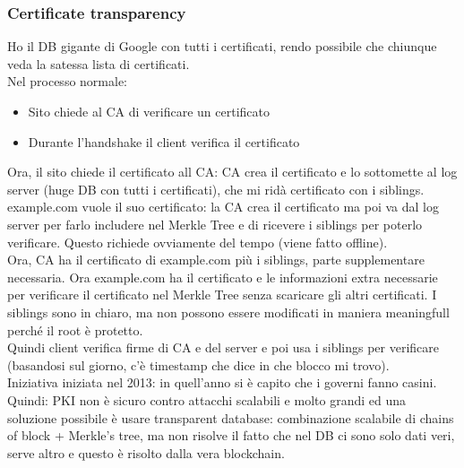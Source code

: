 \documentclass[16px]{article}
\begin{document}
\subsubsection{Certificate transparency}
Ho il DB gigante di Google con tutti i certificati, rendo possibile che chiunque veda la satessa lista di certificati.\\ Nel processo normale:
\begin{itemize}
\item Sito chiede al CA di verificare un certificato
\item Durante l'handshake il client verifica il certificato
\end{itemize}
Ora, il sito chiede il certificato all CA: CA crea il certificato e lo sottomette al log server (huge DB con tutti i certificati), che mi ridà certificato con i siblings.\\ example.com vuole il suo certificato: la CA crea il certificato ma poi va dal log server per farlo includere nel Merkle Tree e di ricevere i siblings per poterlo verificare. Questo richiede ovviamente del tempo (viene fatto offline).\\ Ora, CA ha il certificato di example.com più i siblings, parte supplementare necessaria. Ora example.com ha il certificato e le informazioni extra necessarie per verificare il certificato nel Merkle Tree senza scaricare gli altri certificati. I siblings sono in chiaro, ma non possono essere modificati in maniera meaningfull perché il root è protetto.\\ Quindi client verifica firme di CA e del server e poi usa i siblings per verificare (basandosi sul giorno, c'è timestamp che dice in che blocco mi trovo).\\ Iniziativa iniziata nel 2013: in quell'anno si è capito che i governi fanno casini.\\ Quindi: PKI non è sicuro contro attacchi scalabili e molto grandi ed una soluzione possibile è usare transparent database: combinazione scalabile di chains of block + Merkle's tree, ma non risolve il fatto che nel DB ci sono solo dati veri, serve altro e questo è risolto dalla vera blockchain.
\end{document}
